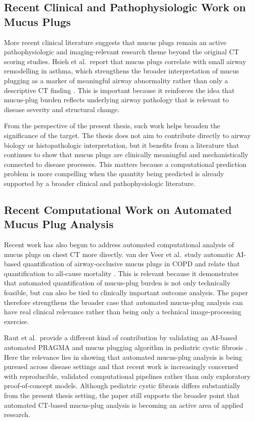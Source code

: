 \subsection{Recent Clinical and Pathophysiologic Work on Mucus Plugs}
More recent clinical literature suggests that mucus plugs remain an active pathophysiologic and imaging-relevant research theme beyond the original CT scoring studies. Hsieh et al.\ report that mucus plugs correlate with small airway remodelling in asthma, which strengthens the broader interpretation of mucus plugging as a marker of meaningful airway abnormality rather than only a descriptive CT finding \cite{hsieh2025smallairwaymucus}. This is important because it reinforces the idea that mucus-plug burden reflects underlying airway pathology that is relevant to disease severity and structural change.

From the perspective of the present thesis, such work helps broaden the significance of the target. The thesis does not aim to contribute directly to airway biology or histopathologic interpretation, but it benefits from a literature that continues to show that mucus plugs are clinically meaningful and mechanistically connected to disease processes. This matters because a computational prediction problem is more compelling when the quantity being predicted is already supported by a broader clinical and pathophysiologic literature.


\subsection{Recent Computational Work on Automated Mucus Plug Analysis}
Recent work has also begun to address automated computational analysis of mucus plugs on chest CT more directly. van der Veer et al.\ study automatic AI-based quantification of airway-occlusive mucus plugs in COPD and relate that quantification to all-cause mortality \cite{vanderveer2025aicopdmucus}. This is relevant because it demonstrates that automated quantification of mucus-plug burden is not only technically feasible, but can also be tied to clinically important outcome analysis. The paper therefore strengthens the broader case that automated mucus-plug analysis can have real clinical relevance rather than being only a technical image-processing exercise.

Raut et al.\ provide a different kind of contribution by validating an AI-based automated PRAGMA and mucus plugging algorithm in pediatric cystic fibrosis \cite{raut2025pragmaai}. Here the relevance lies in showing that automated mucus-plug analysis is being pursued across disease settings and that recent work is increasingly concerned with reproducible, validated computational pipelines rather than only exploratory proof-of-concept models. Although pediatric cystic fibrosis differs substantially from the present thesis setting, the paper still supports the broader point that automated CT-based mucus-plug analysis is becoming an active area of applied research.

